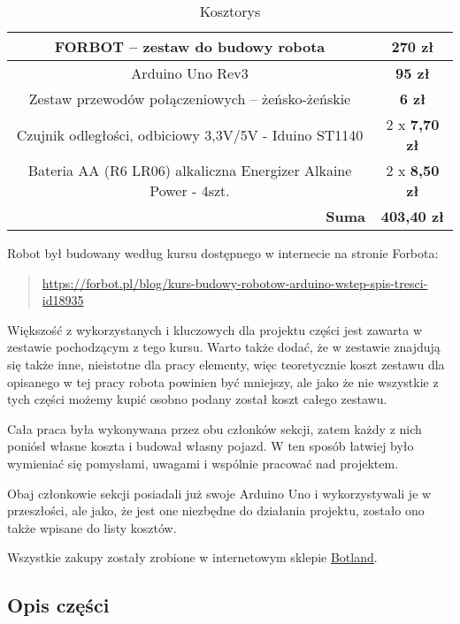 \documentclass[11pt]{article}
\begin{document}
\begin{table}[h!]
	\centering
	\begin{tabular}{|c||c|}
		\hline
		FORBOT -- zestaw do budowy robota & \textbf{270 zł} \\
		\hline
		Arduino Uno Rev3 & \textbf{95 zł} \\
		\hline
		Zestaw przewodów połączeniowych -- żeńsko-żeńskie & \textbf{6 zł} \\
		\hline
		Czujnik odległości, odbiciowy 3,3V/5V - Iduino ST1140 & 2 x \textbf{7,70 zł} \\
		\hline
		Bateria AA (R6 LR06) alkaliczna Energizer Alkaine Power - 4szt. & 2 x \textbf{8,50 zł} \\
		\hline\hline
		\multicolumn{1}{|r||}{\textbf{Suma}\phantom{a}} & \textbf{403,40 zł}\\
		\hline
	\end{tabular}
	\caption{Kosztorys \label{table:kosztorys}}
\end{table}

Robot był budowany według kursu dostępnego w internecie na stronie Forbota:
\begin{quote}
\href{https://forbot.pl/blog/kurs-budowy-robotow-arduino-wstep-spis-tresci-id18935}
{https://forbot.pl/blog/kurs-budowy-robotow-arduino-wstep-spis-tresci-id18935}
\end{quote}

Większość z wykorzystanych i kluczowych dla projektu części jest zawarta w zestawie pochodzącym z tego kursu.
Warto także dodać, że w zestawie znajdują się także inne, nieistotne dla pracy elementy, więc teoretycznie koszt 
zestawu dla opisanego w tej pracy robota powinien być mniejszy, ale jako że nie wszystkie z tych części możemy kupić
osobno podany został koszt całego zestawu.

Cała praca była wykonywana przez obu członków sekcji, zatem każdy z nich poniósł własne koszta i budował własny pojazd. W ten sposób łatwiej było wymieniać się pomysłami, uwagami i wspólnie pracować nad projektem.

Obaj członkowie sekcji posiadali już swoje Arduino Uno i wykorzystywali je w przeszłości, ale jako, że jest one niezbędne do działania projektu, zostało ono także wpisane do listy kosztów.

Wszystkie zakupy zostały zrobione w internetowym sklepie \href{https://botland.com.pl/}{Botland}.

\subsection{Opis części}
\end{document}
